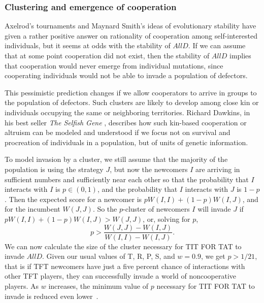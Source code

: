 \subsubsection{Clustering and emergence of cooperation}
Axelrod's tournaments and Maynard Smith's ideas of evolutionary stability have given a rather positive answer on rationality of cooperation among self-interested individuals, but it seems at odds with the stability of $AllD$. If we can assume that at some point cooperation did not exist, then the stability of $AllD$ implies that cooperation would never emerge from individual mutations, since cooperating individuals would not be able to invade a population of defectors.

This pessimistic prediction changes if we allow cooperators to arrive in groups to the population of defectors. Such clusters are likely to develop among close kin or individuals occupying the same or neighboring territories. Richard Dawkins, in his best seller \textit{The Selfish Gene} \cite{dawkins2006selfish}, describes how such kin-based cooperation or altruism can be modeled and understood if we focus not on survival and procreation of individuals in a population, but of units of genetic information.

To model invasion by a cluster, we still assume that the majority of the population is using the strategy $J$, but now the newcomers $I$ are arriving in sufficient numbers and sufficiently near each other so that the probability that $I$ interacts with $I$ is $p \in (0, 1)$, and the probability that $I$ interacts with $J$ is $1-p$. Then the expected score for a newcomer is $pW(I, I) + (1-p) W(I, J)$, and for the incumbent $W(J, J)$. So the $p$-cluster of newcomers $I$ will invade $J$ if $pW(I, I) + (1-p) W(I, J) > W(J, J)$, or, solving for $p$,
\[
p > \frac{W(J, J) - W(I, J)}{W(I, I) - W(I, J)}.
\]
We can now calculate the size of the cluster necessary for TIT FOR TAT to invade $AllD$. Given our usual values of T, R, P, S, and $w = 0.9$, we get $p > 1/21$, that is if TFT newcomers have just a five percent chance of interactions with other TFT players, they can successfully invade a world of noncooperative players. As $w$ increases, the minimum value of $p$ necessary for TIT FOR TAT to invade is reduced even lower~\cite{RobertAxelrod_1981}.

